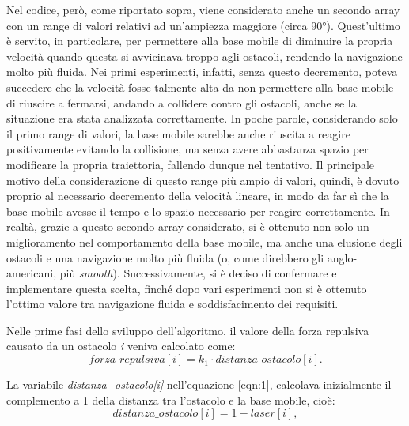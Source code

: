 Nel codice, però, come riportato sopra, viene considerato anche un secondo array con un range di valori relativi ad un'ampiezza maggiore (circa 90°). Quest'ultimo è servito, in particolare, per permettere alla base mobile di diminuire la propria velocità quando questa si avvicinava troppo agli ostacoli, rendendo la navigazione molto più fluida. Nei primi esperimenti, infatti, senza questo decremento, poteva succedere che la velocità fosse talmente alta da non permettere alla base mobile di riuscire a fermarsi, andando a collidere contro gli ostacoli, anche se la situazione era stata analizzata correttamente. In poche parole, considerando solo il primo range di valori, la base mobile sarebbe anche riuscita a reagire positivamente evitando la collisione, ma senza avere abbastanza spazio per modificare la propria traiettoria, fallendo dunque nel tentativo. Il principale motivo della considerazione di questo range più ampio di valori, quindi, è dovuto proprio al necessario decremento della velocità lineare, in modo da far sì che la base mobile avesse il tempo e lo spazio necessario per reagire correttamente. In realtà, grazie a questo secondo array considerato, si è ottenuto non solo un miglioramento nel comportamento della base mobile, ma anche una elusione degli ostacoli e una navigazione molto più fluida (o, come direbbero gli anglo-americani, più \textit{smooth}). Successivamente, si è deciso di confermare e implementare questa scelta, finché dopo vari esperimenti non si è ottenuto l'ottimo valore tra navigazione fluida e soddisfacimento dei requisiti.

Nelle prime fasi dello sviluppo dell’algoritmo, il valore della forza repulsiva causato da un ostacolo \textit{i} veniva calcolato come:
\begin{equation}
\label{eqn:1}
	forza\_repulsiva[i] = k_{1} \cdot distanza\_ostacolo[i].
\end{equation}

La variabile \textit{distanza\_ostacolo[i]} nell'equazione \ref{eqn:1}, calcolava inizialmente il complemento a 1 della distanza tra l’ostacolo e la base mobile, cioè:
\begin{equation}
	distanza\_ostacolo[i] = 1 - laser[i],
\end{equation}
 
